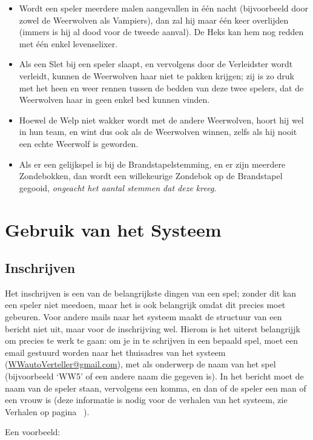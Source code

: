 \documentclass[12pt]{article}
\begin{document}
\begin{itemize}
  	\item Wordt een speler meerdere malen aangevallen in \'e\'en nacht (bijvoorbeeld door zowel de Weerwolven als Vampiers), dan zal hij maar \'e\'en keer overlijden (immers is hij al dood voor de tweede aanval). De Heks kan hem nog redden met \'e\'en enkel levenselixer.
  	\item Als een Slet bij een speler slaapt, en vervolgens door de Verleidster wordt verleidt, kunnen de Weerwolven haar niet te pakken krijgen; zij is zo druk met het heen en weer rennen tussen de bedden van deze twee spelers, dat de Weerwolven haar in geen enkel bed kunnen vinden.
  	\item Hoewel de Welp niet wakker wordt met de andere Weerwolven, hoort hij wel in hun team, en wint dus ook als de Weerwolven winnen, zelfs als hij nooit een echte Weerwolf is geworden.
  	\item Als er een gelijkspel is bij de Brandstapelstemming, en er zijn meerdere Zondebokken, dan wordt een willekeurige Zondebok op de Brandstapel gegooid, \emph{ongeacht het aantal stemmen dat deze kreeg.}
    \end{itemize}

\section{Gebruik van het Systeem}

  \subsection{Inschrijven}
  
    Het inschrijven is een van de belangrijkste dingen van een spel; zonder dit kan een speler niet meedoen, maar het is ook belangrijk omdat dit precies moet gebeuren. Voor andere mails naar het systeem maakt de structuur van een bericht niet uit, maar voor de inschrijving wel. Hierom is het uiterst belangrijjk om precies te werk te gaan: om je in te schrijven in een bepaald spel, moet een email gestuurd worden naar het thuisadres van het systeem (\href{mailto:<WWautoVerteller@gmail.com>}{WWautoVerteller@gmail.com}), met als onderwerp de naam van het spel (bijvoorbeeld `WW5' of een andere naam die gegeven is). In het bericht moet de naam van de speler staan, vervolgens een komma, en dan of de speler een man of een vrouw is (deze informatie is nodig voor de verhalen van het systeem, zie Verhalen op pagina~\pageref{subsec:verhalen} ).
    
    Een voorbeeld:
    
\end{document}
